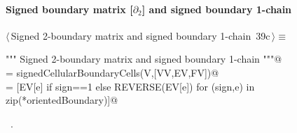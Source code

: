 \documentclass[11pt,oneside]{article}    %
\begin{document}
\paragraph{Signed boundary matrix [$\partial_2$] and signed boundary 1-chain}
\begin{flushleft} \small \label{scrap65}
\protect{}$\langle\,$Signed 2-boundary matrix and signed boundary 1-chain\nobreak\ {\footnotesize 39c}$\,\rangle\equiv$
\vspace{-1ex}
\begin{list}{}{} \item
\mbox{}\verb@""" Signed 2-boundary matrix  and signed boundary 1-chain """@\\
\mbox{}\verb@orientedBoundary = signedCellularBoundaryCells(V,[VV,EV,FV])@\\
\mbox{}\verb@cells = [EV[e] if sign==1 else REVERSE(EV[e]) for (sign,e) in zip(*orientedBoundary)]@\\
\mbox{}\verb@@{\NWsep}
\end{list}
\vspace{-1ex}
\footnotesize\addtolength{\baselineskip}{-1ex}
\begin{list}{}{\setlength{\itemsep}{-\parsep}\setlength{\itemindent}{-\leftmargin}}
\item \NWtxtMacroRefIn\ .
\end{list}
\end{flushleft}
\end{document}
